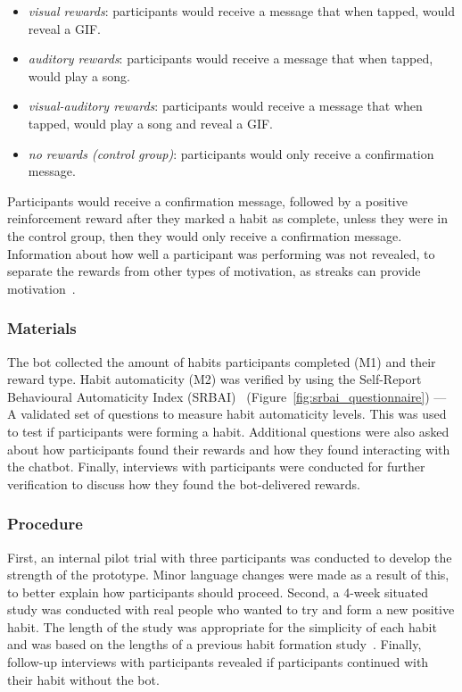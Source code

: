 \begin{itemize}
\item \textit{visual rewards}: participants would receive a message that when tapped, would reveal a GIF.
\item \textit{auditory rewards}: participants would receive a message that when tapped, would play a song.
\item \textit{visual-auditory rewards}: participants would receive a message that when tapped, would play a song and reveal a GIF.
\item \textit{no rewards (control group)}: participants would only receive a confirmation message.
\end{itemize}

Participants would receive a confirmation message, followed by a positive reinforcement reward after they marked a habit as complete, unless they were in the control group, then they would only receive a confirmation message. Information about how well a participant was performing was not revealed, to separate the rewards from other types of motivation, as streaks can provide motivation~\cite{article_dont_kick_habit}.

\subsubsection{Materials}
The bot collected the amount of habits participants completed (M1) and their reward type. Habit automaticity (M2) was verified by using the Self-Report Behavioural Automaticity Index (SRBAI)~\cite{article_4q_SRBAI} (Figure~\ref{fig:srbai_questionnaire}) --- A validated set of questions to measure habit automaticity levels. This was used to test if participants were forming a habit. Additional questions were also asked about how participants found their rewards and how they found interacting with the chatbot. Finally, interviews with participants were conducted for further verification to discuss how they found the bot-delivered rewards.

\subsubsection{Procedure}
First, an internal pilot trial with three participants was conducted to develop the strength of the prototype. Minor language changes were made as a result of this, to better explain how participants should proceed. Second, a  4-week situated study was conducted with real people who wanted to try and form a new positive habit. The length of the study was appropriate for the simplicity of each habit and was based on the lengths of a previous habit formation study~\cite{article_beyond_self_tracking_designing_apps}. Finally, follow-up interviews with participants revealed if participants continued with their habit without the bot.

